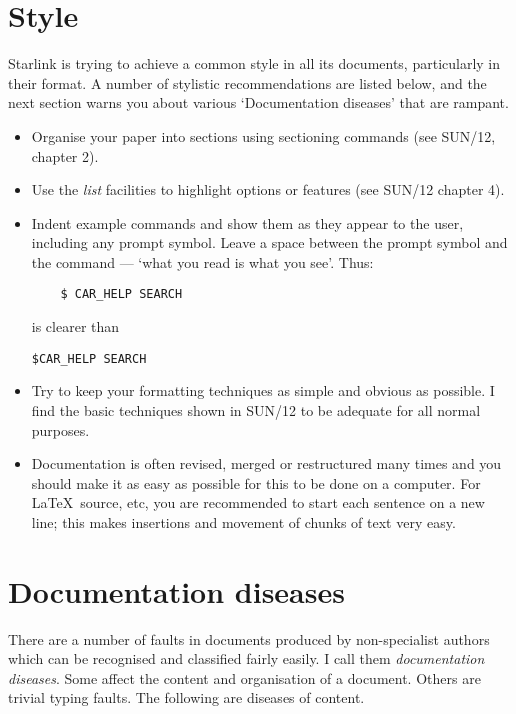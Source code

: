 \section{Style}

Starlink is trying to achieve a common style in all its documents, particularly
in their format.
A number of stylistic recommendations are listed below, and the next section
warns you about various `Documentation diseases' that are rampant.

\begin{itemize}

\item Organise your paper into sections using sectioning commands (see SUN/12,
chapter 2).

\item Use the {\em list}\/ facilities to highlight options or features
(see SUN/12 chapter 4).

\item Indent example commands and show them as they appear to the user,
including any prompt symbol.
Leave a space between the prompt symbol and the command --- `what you read is
what you see'.
Thus:
\begin{verbatim}
    $ CAR_HELP SEARCH
\end{verbatim}
is clearer than
\begin{verbatim}
$CAR_HELP SEARCH
\end{verbatim}

\item Try to keep your formatting techniques as simple and obvious as possible.
I find the basic techniques shown in SUN/12 to be adequate for all normal
purposes.

\item Documentation is often revised, merged or restructured many times and
you should make it as easy as possible for this to be done on a computer.
For \LaTeX\ source, etc, you are recommended to start each sentence on a new
line; this makes insertions and movement of chunks of text very easy.

\end{itemize}

\section{Documentation diseases}

There are a number of faults in documents produced by non-specialist authors
which can be recognised and classified fairly easily.
I call them {\em documentation diseases}.
Some affect the content and organisation of a document.
Others are trivial typing faults.
The following are diseases of content.

